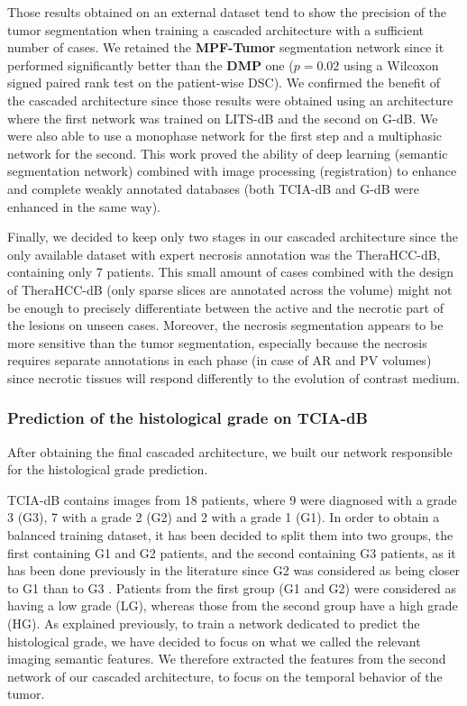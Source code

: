 \documentclass[]{article}
\newcommand{\pplfont}[1]{{\textbf{\fontfamily{ppl}\selectfont #1}}}
\newcommand{\lmttfont}[1]{{\fontfamily{lmtt}\selectfont #1}}
\begin{document}
Those results obtained on an external dataset tend to show the precision
of the tumor segmentation when training a cascaded architecture with a
sufficient number of cases.
We retained the \pplfont{MPF-Tumor} segmentation network since it performed
significantly better than the \pplfont{DMP} one ($ p = 0.02 $ using a Wilcoxon signed
paired rank test on the patient-wise DSC).
We confirmed the benefit of the cascaded architecture since those results
were obtained using an architecture where the first network was trained
on \lmttfont{LITS-dB} and the second on \lmttfont{G-dB}. We were also able to use
a monophase network for the first step and a multiphasic network for the
second.
This work proved the ability of deep learning (semantic segmentation
network) combined with image processing (registration) to enhance and
complete weakly annotated databases (both \lmttfont{TCIA-dB} and \lmttfont{G-dB} were
enhanced in the same way).

Finally, we decided to keep only two stages in our cascaded architecture
since the only available dataset with expert necrosis annotation was the
\lmttfont{TheraHCC-dB}, containing only 7 patients. This small amount of cases
combined with the design of \lmttfont{TheraHCC-dB} (only sparse slices are
annotated across the volume) might not be enough to precisely
differentiate between the active and the necrotic part of the lesions on
unseen cases. Moreover, the necrosis segmentation appears to be more
sensitive than the tumor segmentation, especially because the necrosis
requires separate annotations in each phase (in case of AR and PV volumes) since necrotic tissues will respond differently to the evolution of contrast medium.

\subsubsection{Prediction of the histological grade on
TCIA-dB}\label{prediction-of-the-histological-grade-on-tcia-db}

After obtaining the final cascaded architecture, we built our network responsible for the
histological grade prediction.

\lmttfont{TCIA-dB} contains images from 18 patients, where 9 were diagnosed with a
grade 3 (G3), 7 with a grade 2 (G2) and 2 with a grade 1 (G1). In order
to obtain a balanced training dataset, it has been decided to split them
into two groups, the first containing G1 and G2 patients, and the second containing G3 patients, as it has been done previously in the literature since G2
was considered as being closer to G1 than to G3 \cite{Han2013,Zucman-Rossi2015}. Patients from the first group (G1 and G2) were considered as
having a low grade (LG), whereas those from the second group have a high
grade (HG).
As explained previously, to train a network dedicated to predict the
histological grade, we have decided to focus on what we called the
relevant imaging semantic features.
We therefore extracted the features from the second network of our
cascaded architecture, to focus on the temporal behavior of the tumor.
\end{document}
